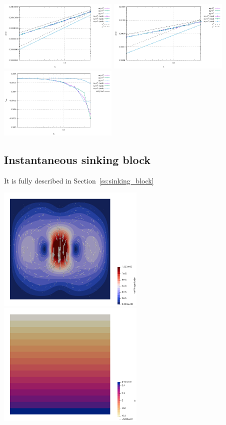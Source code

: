 \begin{center}
\includegraphics[width=5.7cm]{python_codes/fieldstone_76/results/bench3/errors_v}
\includegraphics[width=5.7cm]{python_codes/fieldstone_76/results/bench3/errors_p}
\includegraphics[width=5.7cm]{python_codes/fieldstone_76/results/bench3/vrms}
\end{center}



\subsection*{Instantaneous sinking block}

It is fully described in Section~\ref{ss:sinking_block}

\begin{center}
\includegraphics[width=7cm]{python_codes/fieldstone_76/results/block/vel}
\includegraphics[width=7cm]{python_codes/fieldstone_76/results/block/press}
\end{center}


